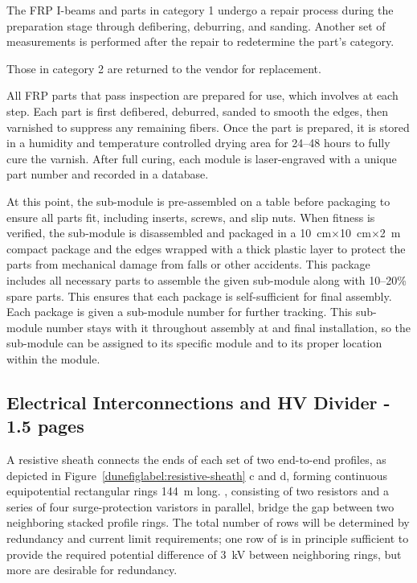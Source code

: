 The FRP I-beams and parts in category 1 undergo a repair process during the preparation stage through defibering, deburring, and sanding.  Another set of measurements is performed after the repair to redetermine the part's category.

Those in category 2 are returned to the vendor for replacement.

All FRP parts that pass inspection are prepared for use, which involves  at each step.  Each part is first defibered, deburred, sanded to smooth the edges, then varnished to
suppress any remaining fibers.  Once the part is prepared, it is stored in a humidity and temperature controlled drying area for \numrange{24}{48} hours to fully cure the varnish.  After full curing, each module is laser-engraved with a unique part number and recorded in a   database. 

At this point, the sub-module is pre-assembled on a table before packaging to ensure all parts fit, including inserts, screws, and slip nuts.   When fitness is verified, the sub-module is disassembled and packaged in a \SI{10}{\cm}$\times$\SI{10}{\cm}$\times$\SI{2}{\m} compact package and the edges wrapped with a thick plastic layer to protect the parts from mechanical damage from falls or other accidents.  This package includes all necessary parts to assemble the given sub-module along with \numrange{10}{20}\% spare parts.  This ensures that each package is self-sufficient for final assembly.  Each package is given a sub-module number for further tracking.  This sub-module number stays with it throughout assembly at \surf and final installation, so the sub-module can be assigned to its specific module and to its proper location within the module. 

\subsection{Electrical Interconnections and HV Divider - 1.5 pages}
\label{sec:fddp-hv-prod-interconnect}

A resistive sheath connects the ends of each set of two end-to-end  profiles, as depicted in Figure~\ref{dunefiglabel:resistive-sheath} c and d, forming continuous equipotential rectangular rings  \SI{144}{\m} long. 
, consisting of two resistors and a series of four surge-protection varistors in parallel, bridge the gap between two neighboring stacked profile rings.   The total number of  rows will be determined by redundancy and current limit requirements;  one row of  is in principle sufficient to provide the required potential difference of \SI{3}{\kV} between neighboring rings, but more are desirable for redundancy.


